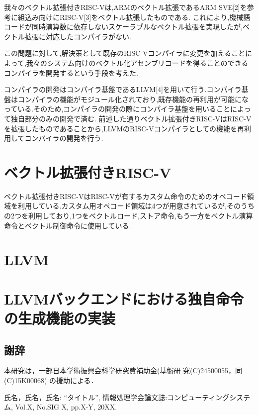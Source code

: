 \documentclass[a4paper,9pt, twocolumn]{jarticle}
\renewcommand{\baselinestretch}{0.87}   %
\begin{document}
我々のベクトル拡張付きRISC-Vは,ARMのベクトル拡張であるARM SVE[2]を参考に組込み向けにRISC-V[3]をベクトル拡張したものである.
これにより,機械語コードが同時演算数に依存しないスケーラブルなベクトル拡張を実現したが,ベクトル拡張に対応したコンパイラがない.

この問題に対して,解決策として既存のRISC-Vコンパイラに変更を加えることによって,我々のシステム向けのベクトル化アセンブリコードを得ることのできるコンパイラを開発するという手段を考えた.

コンパイラの開発はコンパイラ基盤であるLLVM[4]を用いて行う.コンパイラ基盤はコンパイラの機能がモジュール化されており,既存機能の再利用が可能になっている.そのため,コンパイラの開発の際にコンパイラ基盤を用いることによって独自部分のみの開発で済む.
前述した通りベクトル拡張付きRISC-VはRISC-Vを拡張したものであることから,LLVMのRISC-Vコンパイラとしての機能を再利用してコンパイラの開発を行う.


\section{ベクトル拡張付きRISC-V}
ベクトル拡張付きRISC-VはRISC-Vが有するカスタム命令のためのオペコード領域を利用している.カスタム用オペコード領域は4つが用意されているが,そのうちの2つを利用しており,1つをベクトルロード,ストア命令,もう一方をベクトル演算命令とベクトル制御命令に使用している.


\section{LLVM}

\section{LLVMバックエンドにおける独自命令の生成機能の実装}

\renewcommand{\baselinestretch}{0.83}\selectfont
\subsection*{\small 謝辞}
\vspace{-0.5mm}
{\small 本研究は，一部日本学術振興会科学研究費補助金(基盤研
究(C)24500055，同(C)15K00068) の援助による．}


%
%
\begin{thebibliography}{9}
\itemsep -1.7pt

{\small 氏名，氏名，氏名:      %
\newblock ``タイトル'',
\newblock 情報処理学会論文誌:コンピューティングシステム,
\newblock Vol.X,
\newblock No.SIG X,
\newblock pp.X-Y,
\newblock 20XX.}

\end{thebibliography}
\end{document}
